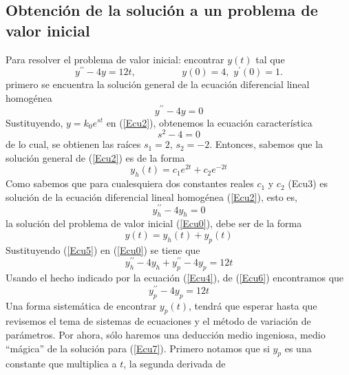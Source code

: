 \documentclass[12pt]{article}
\begin{document}
\subsection{Obtención de la solución a un problema de valor inicial}
Para resolver el problema de valor inicial: encontrar $y(t)$ tal que
\begin{equation}
y^{\prime\prime}-4y=12t,\hspace{2cm}y(0)=4,\,\,y^{\prime}(0)=1.
\end{equation}
primero se encuentra la solución general de la ecuación diferencial lineal homogénea
\begin{equation}
y^{\prime\prime}-4y=0
\label{Ecu2}
\end{equation}
Sustituyendo, $y=k_{0}e^{st}$ en (\ref{Ecu2}), obtenemos la ecuación característica
\begin{equation}
s^{2}-4=0
\end{equation}
de lo cual, se obtienen las raíces $s_{1}=2,\,s_{2}=-2$. Entonces, sabemos que la solución 
general de (\ref{Ecu2}) es de la forma
\begin{equation}
y_{h}(t)=c_{1}e^{2t}+c_{2}e^{-2t}
\label{Ecu3}
\end{equation}
Como sabemos que para cualesquiera dos constantes reales $c_{1}$ y $c_{2}$ (Ecu3) es solución 
de la ecuación diferencial lineal homogénea (\ref{Ecu2}), esto es,
\begin{equation}
y_{h}^{\prime\prime}-4y_{h}=0
\label{Ecu4}
\end{equation}
la solución del problema de valor inicial (\ref{Ecu0}), debe ser de la forma
\begin{equation}
y(t)=y_{h}(t)+y_{p}(t)
\label{Ecu5}
\end{equation}
Sustituyendo (\ref{Ecu5}) en (\ref{Ecu0}) se tiene que
\begin{equation}
y_{h}^{\prime\prime}-4y_{h}+y_{p}^{\prime\prime}-4y_{p}=12t
\label{Ecu6}
\end{equation}
Usando el hecho indicado por la ecuación (\ref{Ecu4}), de (\ref{Ecu6}) encontramos que 
\begin{equation}
y_{p}^{\prime\prime}-4y_{p}=12t
\label{Ecu7}
\end{equation}
Una forma sistemática de encontrar $y_{p}(t)$, tendrá que esperar hasta que revisemos 
el tema de sistemas de ecuaciones y el método de variación de parámetros. Por ahora, sólo 
haremos una deducción medio ingeniosa, medio ``mágica'' de la solución para (\ref{Ecu7}). 
Primero notamos que si $y_{p}$ es una constante que multiplica a $t$, la segunda derivada de 
\end{document}
